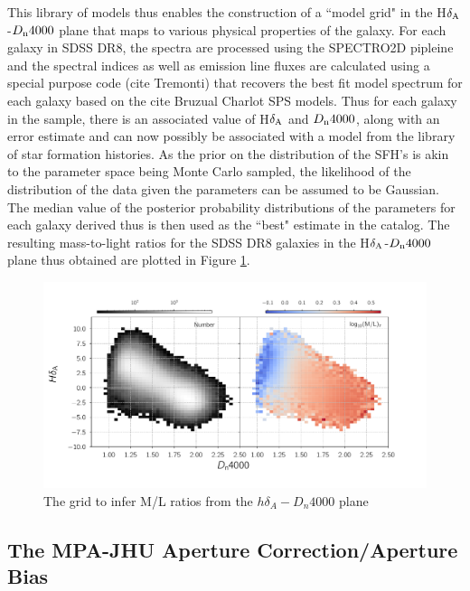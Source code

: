 This library of models thus enables the construction of a ``model grid" in the H$\delta_{\rm A}$-$D_{\rm n}4000$ plane that maps to various physical properties of the galaxy. For each galaxy in SDSS DR8, the spectra are processed using the SPECTRO2D pipleine and the spectral indices as well as emission line fluxes are calculated using a special purpose code (cite Tremonti) that recovers the best fit model spectrum for each galaxy based on the cite Bruzual Charlot SPS models. Thus for each galaxy in the sample, there is an associated value of H$\delta_{\rm A}$ and $D_{\rm n}4000$, along with an error estimate and can now possibly be associated with a model from the library of star formation histories. As the prior on the distribution of the SFH's is akin to the parameter space being Monte Carlo sampled, the likelihood of the distribution of the data given the parameters can be assumed to be Gaussian. The median value of the posterior probability distributions of the parameters for each galaxy derived thus is then used as the ``best" estimate in the catalog. The resulting mass-to-light ratios for the SDSS DR8 galaxies in the H$\delta_{\rm A}$-$D_{\rm n}4000$ plane thus obtained are plotted in Figure \ref{fig:kauff_grid}.\\ 

\begin{figure}
\includegraphics[width=\textwidth]{figures/hd_d4000_mlratio_coarser_binning.pdf}
\caption[The \citet{kauffmann_stellar_2003} grid to infer M/L ratios from the $h\delta_{A}-D_{n}4000$ plane]
{The \citet{kauffmann_stellar_2003} grid to infer M/L ratios from the $h\delta_{A}-D_{n}4000$ plane
\label{fig:kauff_grid}}
\end{figure}

\subsection{The MPA-JHU Aperture Correction/Aperture Bias}
\label{apercorr}


